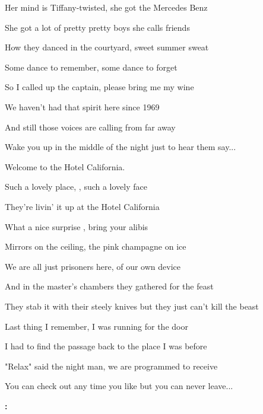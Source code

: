 \begin{song}
 Her mind is Tiffany-twisted,  she got the Mercedes Benz \par
{} She got a lot of pretty pretty boys  she calls friends \par
{} How they danced in the courtyard, sweet summer sweat \par
{} Some dance to remember,  some dance to forget \par

\bigskip

 So I called up the captain,  please bring me my wine  \par
{} We haven't had that spirit here since  1969 \par
{} And still those voices are calling from far away \par
{} Wake you up in the middle of the night  just to hear them say... \par

\bigskip

 Welcome to the Hotel California. \par
Such a lovely place, , such a lovely face \par
They're livin' it up at the Hotel California \par
What a nice surprise , bring your alibis \par

\bigskip

 Mirrors on the ceiling,  the pink champagne on ice  \par
{} We are all just prisoners here,  of our own device \par
{} And in the master's chambers  they gathered for the feast \par
{} They stab it with their steely knives but they just can't kill the beast \par

\bigskip

 Last thing I remember, I was  running for the door \par
{} I had to find the passage back to the place I was before \par
{} "Relax" said the night man, we are  programmed to receive \par
{} You can check out any time you like  but you can never leave... \par

\bigskip

\Outro\textbf{:} \par
{}    \par
{}    \par
{}

\end{song}
